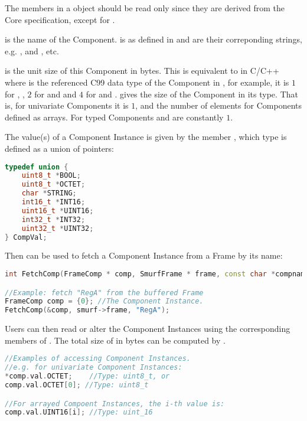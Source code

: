The members in a  object should be read only since they are derived from the Core specification, except for . 

 is the name of the Component.  is as defined in  and  are their correponding strings, e.g. ,  and , etc. 

 is the unit size of this Component in bytes. This is equivalent to  in C/C++ where  is the referenced C99 data type of the Component in , for example, it is $1$ for , , $2$ for  and  and $4$ for  and .  gives the size of the Component in its type. That is, for univariate Components it is $1$, and the number of elements for Components defined as arrays. For  typed Components  and  are constantly $1$.

The value(s) of a Component Instance is given by the member , which type is defined as a union of pointers:
\begin{lstlisting}[language=C++, caption={union CompVal\label{api:CompValC}}]
typedef union {
	uint8_t *BOOL;
	uint8_t *OCTET;
	char *STRING;
	int16_t *INT16;
	uint16_t *UINT16;
	int32_t *INT32;
	uint32_t *UINT32;
} CompVal;
\end{lstlisting}

Then  can be used to fetch a Component Instance from a Frame by its name:
\begin{lstlisting}[language=C++, caption={FetchComp()\label{api:FetchCompC}}]
int FetchComp(FrameComp * comp, SmurfFrame * frame, const char *compname);

//Example: fetch "RegA" from the buffered Frame
FrameComp comp = {0}; //The Component Instance.
FetchComp(&comp, smurf->frame, "RegA");
\end{lstlisting}

Users can then read or alter the Component Instances using the corresponding members of . The total size of  in bytes can be computed by .
\begin{lstlisting}[language=C++, caption={Accessing value(s) of a Components Instance in C/C++\label{api:AccessValC}}]
//Examples of accessing Component Instances.
//e.g. for univariate Component Instances:
*comp.val.OCTET;	//Type: uint8_t, or
comp.val.OCTET[0]; //Type: uint8_t

//For arrayed Compoent Instances, the i-th value is:
comp.val.UINT16[i];	//Type: uint_16
\end{lstlisting}

